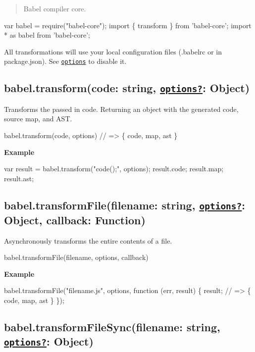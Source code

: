 \begin{quote}
Babel compiler core. \end{quote}



\begin{DoxyCode}
var babel = require("babel-core");
import \{ transform \} from 'babel-core';
import * as babel from 'babel-core';
\end{DoxyCode}


All transformations will use your local configuration files (.babelrc or in package.\+json). See \href{#options}{\tt options} to disable it.

\subsection*{babel.\+transform(code\+: string, \href{#options}{\tt options?}\+: Object)}

Transforms the passed in {\ttfamily code}. Returning an object with the generated code, source map, and A\+ST.


\begin{DoxyCode}
babel.transform(code, options) // => \{ code, map, ast \}
\end{DoxyCode}


{\bfseries Example}


\begin{DoxyCode}
var result = babel.transform("code();", options);
result.code;
result.map;
result.ast;
\end{DoxyCode}


\subsection*{babel.\+transform\+File(filename\+: string, \href{#options}{\tt options?}\+: Object, callback\+: Function)}

Asynchronously transforms the entire contents of a file.


\begin{DoxyCode}
babel.transformFile(filename, options, callback)
\end{DoxyCode}


{\bfseries Example}


\begin{DoxyCode}
babel.transformFile("filename.js", options, function (err, result) \{
  result; // => \{ code, map, ast \}
\});
\end{DoxyCode}


\subsection*{babel.\+transform\+File\+Sync(filename\+: string, \href{#options}{\tt options?}\+: Object)}

